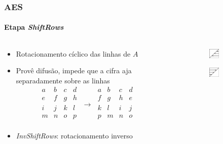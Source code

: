 \documentclass[12pt]{beamer}
\begin{document}
\begin{frame}
  \frametitle{AES}
  \framesubtitle{Etapa \emph{ShiftRows}}
  \begin{columns}[T]
    \begin{column}{.7\textwidth}
      \begin{itemize}
        \item Rotacionamento cíclico das linhas de $A$
        \item Provê difusão, impede que a cifra aja separadamente sobre as
            linhas
        \begin{equation*}
          \begin{matrix}
            a & b & c & d \\
            e & f & g & h \\
            i & j & k & l \\
            m & n & o & p \\
          \end{matrix} \; \longrightarrow \;
          \begin{matrix}
            a & b & c & d \\
            f & g & h & e \\
            k & l & i & j \\
            p & m & n & o \\
          \end{matrix}
        \end{equation*}
        \item \emph{InvShiftRows}: rotacionamento inverso
      \end{itemize}
    \end{column}
    \begin{column}{.25\textwidth}
      \begin{figure}
        \centering
        \begin{subfigure}[b]{0.7\textwidth}
          \includegraphics{img/shift_rows_fwd.pdf}
          \vspace{2mm}
        \end{subfigure}

        \begin{subfigure}[b]{0.7\textwidth}
          \includegraphics{img/shift_rows_inv.pdf}
        \end{subfigure}


\end{figure}
\end{column}
\end{columns}
\end{frame}
\end{document}
